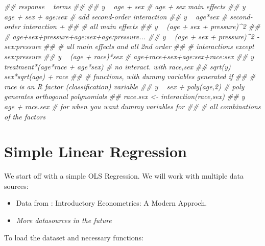 \documentclass[]{book}
\newenvironment{Shaded}{\begin{snugshade}}{\end{snugshade}}
\newcommand{\CommentTok}[1]{\textcolor[rgb]{0.56,0.35,0.01}{\textit{#1}}}
\providecommand{\tightlist}{%
  \setlength{\itemsep}{0pt}\setlength{\parskip}{0pt}}
\begin{document}
\begin{Shaded}
\begin{Highlighting}[]
\CommentTok{## response ~ terms}
\CommentTok{## }
\CommentTok{## y ~ age + sex            # age + sex main effects}
\CommentTok{## y ~ age + sex + age:sex  # add second-order interaction}
\CommentTok{## y ~ age*sex              # second-order interaction +}
\CommentTok{##                          # all main effects}
\CommentTok{## y ~ (age + sex + pressure)^2}
\CommentTok{##                          # age+sex+pressure+age:sex+age:pressure...}
\CommentTok{## y ~ (age + sex + pressure)^2 - sex:pressure}
\CommentTok{##                          # all main effects and all 2nd order}
\CommentTok{##                          # interactions except sex:pressure}
\CommentTok{## y ~ (age + race)*sex     # age+race+sex+age:sex+race:sex}
\CommentTok{## y ~ treatment*(age*race + age*sex) # no interact. with race,sex}
\CommentTok{## sqrt(y) ~ sex*sqrt(age) + race}
\CommentTok{## # functions, with dummy variables generated if}
\CommentTok{## # race is an R factor (classification) variable}
\CommentTok{## y ~ sex + poly(age,2)    # poly generates orthogonal polynomials}
\CommentTok{## race.sex <- interaction(race,sex)}
\CommentTok{## y ~ age + race.sex       # for when you want dummy variables for}
\CommentTok{##                          # all combinations of the factors}
\end{Highlighting}
\end{Shaded}

\hypertarget{simple-linear-regression}{%
\section{Simple Linear Regression}\label{simple-linear-regression}}

We start off with a simple OLS Regression. We will work with multiple
data sources:

\begin{itemize}
\tightlist
\item
  Data from \citet{wooldridge2015introductory} : Introductory
  Econometrics: A Modern Approch.
\item
  \emph{More datasources in the future}
\end{itemize}

To load the dataset and necessary functions:
\end{document}
